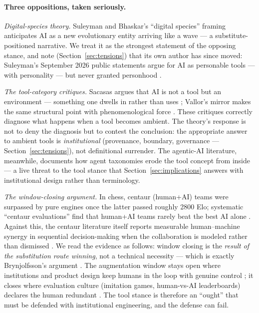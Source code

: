 \documentclass[10pt]{article}
\begin{document}
\paragraph{Three oppositions, taken seriously.}

\emph{Digital-species theory.} Suleyman and Bhaskar's ``digital species'' framing anticipates AI as a new evolutionary entity arriving like a wave \cite{suleyman2023coming} --- a substitute-positioned narrative. We treat it as the strongest statement of the opposing stance, and note (Section~\ref{sec:tensions}) that its own author has since moved: Suleyman's September 2026 public statements argue for AI as personable tools --- with personality --- but never granted personhood \cite{suleyman2026personable}.

\emph{The tool-category critiques.} Sacasas argues that AI is not a tool but an environment --- something one dwells in rather than uses \cite{sacasas2023your}; Vallor's mirror makes the same structural point with phenomenological force \cite{vallor2024mirror}. These critiques correctly diagnose what happens when a tool becomes ambient. The theory's response is not to deny the diagnosis but to contest the conclusion: the appropriate answer to ambient tools is \emph{institutional} (provenance, boundary, governance --- Section~\ref{sec:tensions}), not definitional surrender. The agentic-AI literature, meanwhile, documents how agent taxonomies erode the tool concept from inside \cite{sims2025agents} --- a live threat to the tool stance that Section~\ref{sec:implications} answers with institutional design rather than terminology.

\emph{The window-closing argument.} In chess, centaur (human+AI) teams were surpassed by pure engines once the latter passed roughly 2800 Elo; systematic ``centaur evaluations'' find that human+AI teams rarely beat the best AI alone \cite{haupt2025imitation}. Against this, the centaur literature itself reports measurable human--machine synergy in sequential decision-making when the collaboration is modeled rather than dismissed \cite{shoresh2024modeling}. We read the evidence as follows: window closing is the \emph{result of the substitution route winning}, not a technical necessity --- which is exactly Brynjolfsson's argument \cite{brynjolfsson2022turing}. The augmentation window stays open where institutions and product design keep humans in the loop with genuine control \cite{shneiderman2022human}; it closes where evaluation culture (imitation games, human-vs-AI leaderboards) declares the human redundant \cite{haupt2025imitation}. The tool stance is therefore an ``ought'' that must be defended with institutional engineering, and the defense can fail.
\end{document}
